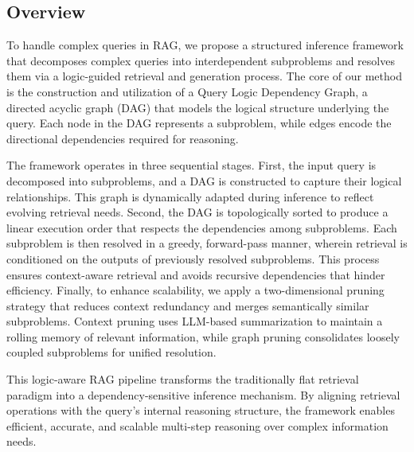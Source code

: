 \documentclass[letterpaper]{article} %
\begin{document}
\subsection{Overview}

To handle complex queries in RAG, we propose a structured inference framework that decomposes complex queries into interdependent subproblems and resolves them via a logic-guided retrieval and generation process. The core of our method is the construction and utilization of a Query Logic Dependency Graph, a directed acyclic graph (DAG) that models the logical structure underlying the query. Each node in the DAG represents a subproblem, while edges encode the directional dependencies required for reasoning.

The framework operates in three sequential stages. First, the input query is decomposed into subproblems, and a DAG is constructed to capture their logical relationships. This graph is dynamically adapted during inference to reflect evolving retrieval needs. Second, the DAG is topologically sorted to produce a linear execution order that respects the dependencies among subproblems. Each subproblem is then resolved in a greedy, forward-pass manner, wherein retrieval is conditioned on the outputs of previously resolved subproblems. This process ensures context-aware retrieval and avoids recursive dependencies that hinder efficiency. Finally, to enhance scalability, we apply a two-dimensional pruning strategy that reduces context redundancy and merges semantically similar subproblems. Context pruning uses LLM-based summarization to maintain a rolling memory of relevant information, while graph pruning consolidates loosely coupled subproblems for unified resolution.

This logic-aware RAG pipeline transforms the traditionally flat retrieval paradigm into a dependency-sensitive inference mechanism. By aligning retrieval operations with the query’s internal reasoning structure, the framework enables efficient, accurate, and scalable multi-step reasoning over complex information needs.





\end{document}
